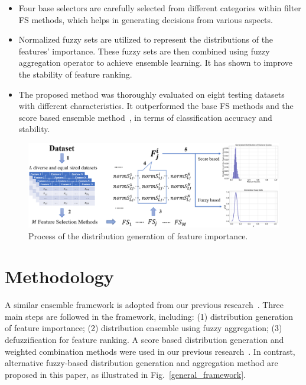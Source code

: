 \documentclass[conference]{IEEEtran}
\begin{document}
\begin{itemize}
	\item Four base selectors are carefully selected from different categories within filter FS methods, which helps in generating decisions from various aspects.
	\item Normalized fuzzy sets are utilized to represent the distributions of the features' importance. These fuzzy sets are then combined using fuzzy aggregation operator to achieve ensemble learning. It has shown to improve the stability of feature ranking.
	\item The proposed method was thoroughly evaluated on eight testing datasets with different characteristics. It outperformed the base FS methods and the score based ensemble method~\cite{shen2019novel}, in terms of classification accuracy and stability.
\end{itemize}



\begin{figure}[h]
	\centering
	\includegraphics[width=1.75\columnwidth]{Figures/Step1_long.png}
	\caption{Process of the distribution generation of feature importance.}
	\label{step1}
\end{figure}

\section{Methodology}
A similar ensemble framework is adopted from our previous research~\cite{shen2019novel}. Three main steps are followed in the framework, including: (1) distribution generation of feature importance; (2) distribution ensemble using fuzzy aggregation; (3) defuzzification for feature ranking. A score based distribution generation and weighted combination methods were used in our previous research~\cite{shen2019novel}. In contrast, alternative fuzzy-based distribution generation and aggregation method are proposed in this paper, as illustrated in Fig.~\ref{general_framework}.
\end{document}
